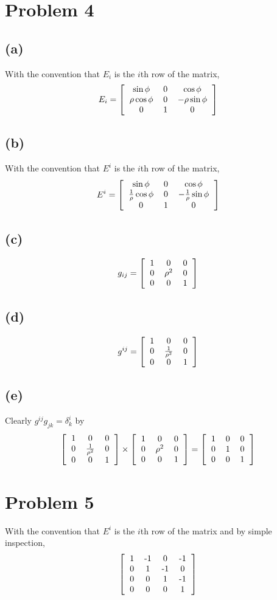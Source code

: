 \documentclass[12pt]{article}
\newcommand{\eq}[1]{\begin{align*}#1\end{align*}}
\newcommand{\mat}[2]{\ensuremath{\left[\begin{tabular}{#1}#2\end{tabular}\right]}}
\begin{document}
\section*{Problem 4}
\subsection*{(a)} With the convention that $E_i$ is the $i$th row of the matrix,
\eq{
	E_i = \mat{ccc}{
		$\sin\phi$ & 0 & $\cos\phi$\\
		$\rho\cos\phi$ & 0 & $-\rho\sin\phi$\\
		0 & 1 & 0
	}
}
\subsection*{(b)}With the convention that $E^i$ is the $i$th row of the matrix,
\eq{
	E^i = \mat{ccc}{
		$\sin\phi$ & 0 & $\cos\phi$\\
		$\frac{1}{\rho}\cos\phi$ & 0 & $-\frac{1}{\rho}\sin\phi$\\
		0 & 1 & 0
	}
}
\subsection*{(c)}
\eq{
	g_{ij} = \mat{ccc}{
		1 & 0 & 0\\
		0 & $\rho^2$ & 0\\
		0 & 0 & 1\\
	}
}
\subsection*{(d)}\eq{
	g^{ij} = \mat{ccc}{
		1 & 0 & 0\\
		0 & $\frac{1}{\rho^2}$ & 0\\
		0 & 0 & 1\\
	}
}

\subsection*{(e)} Clearly $g^{ij}g_{jk} = \delta_k^i$ by
\eq{
\mat{ccc}{
		1 & 0 & 0\\
		0 & $\frac{1}{\rho^2}$ & 0\\
		0 & 0 & 1\\
	} \times
\mat{ccc}{
		1 & 0 & 0\\
		0 & $\rho^2$ & 0\\
		0 & 0 & 1\\
	} = 
\mat{ccc}{
	1 & 0 & 0 \\
	0 & 1 & 0 \\
	0 & 0 & 1 \\
}
}
\section*{Problem 5}With the convention that $E^i$ is the $i$th row of the matrix and by simple inspection,
\eq{
	\mat{cccc}{
		1 & -1 & 0 & -1 \\
		0 & 1 & -1 & 0\\
		0 & 0 & 1 & -1 \\
		0 & 0 & 0 & 1 \\
	}
}
\end{document}
